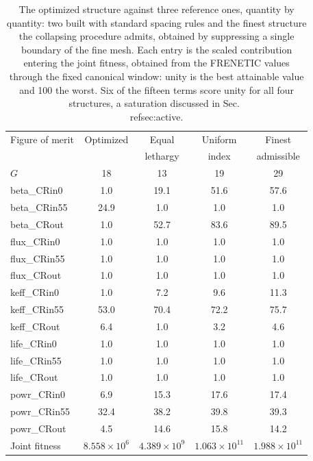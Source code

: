 \begin{table}[htbp]
\centering
\caption{The optimized structure against three reference ones, quantity by
quantity: two built with standard spacing rules and the finest structure the
collapsing procedure admits, obtained by suppressing a single boundary of the
fine mesh. Each entry is the scaled contribution entering the joint fitness,
obtained from the FRENETIC values through the fixed canonical window: unity is
the best attainable value and 100 the worst. Six of the fifteen terms score
unity for all four structures, a saturation discussed in Sec.~\\ref{sec:active}.}
\label{tab:standard}
\begin{tabular}{lcccc}
\hline
Figure of merit & Optimized & Equal & Uniform & Finest \\
     &  & lethargy & index & admissible \\
    $G$ & 18 & 13 & 19 & 29 \\ \hline
    beta\_CRin0 & 1.0 & 19.1 & 51.6 & 57.6 \\
    beta\_CRin55 & 24.9 & 1.0 & 1.0 & 1.0 \\
    beta\_CRout & 1.0 & 52.7 & 83.6 & 89.5 \\
    flux\_CRin0 & 1.0 & 1.0 & 1.0 & 1.0 \\
    flux\_CRin55 & 1.0 & 1.0 & 1.0 & 1.0 \\
    flux\_CRout & 1.0 & 1.0 & 1.0 & 1.0 \\
    keff\_CRin0 & 1.0 & 7.2 & 9.6 & 11.3 \\
    keff\_CRin55 & 53.0 & 70.4 & 72.2 & 75.7 \\
    keff\_CRout & 6.4 & 1.0 & 3.2 & 4.6 \\
    life\_CRin0 & 1.0 & 1.0 & 1.0 & 1.0 \\
    life\_CRin55 & 1.0 & 1.0 & 1.0 & 1.0 \\
    life\_CRout & 1.0 & 1.0 & 1.0 & 1.0 \\
    powr\_CRin0 & 6.9 & 15.3 & 17.6 & 17.4 \\
    powr\_CRin55 & 32.4 & 38.2 & 39.8 & 39.3 \\
    powr\_CRout & 4.5 & 14.6 & 15.8 & 14.2 \\
\hline
    Joint fitness & $8.558\times10^{6}$ & $4.389\times10^{9}$ & $1.063\times10^{11}$ & $1.988\times10^{11}$ \\ \hline
\end{tabular}
\end{table}
